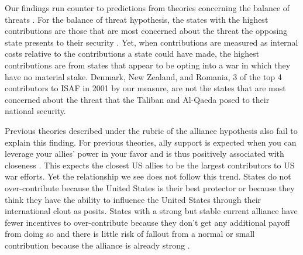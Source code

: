 \documentclass[12pt,letterpaper]{article}
\begin{document}
	Our findings run counter to predictions from theories concerning the balance of threats \citep{walt_originsalliance_1987}. For the balance of threat hypothesis, the states with the highest contributions are those that are most concerned about the threat the opposing state presents to their security \citep{haesebrouck_democraticparticipationair_2018}. Yet, when contributions are measured as internal costs relative to the contributions a state could have made, the highest contributions are from states that appear to be opting into a war in which they have no material stake. Denmark, New Zealand, and Romania, 3 of the top 4 contributors to ISAF in 2001 by our measure, are not the states that are most concerned about the threat that the Taliban and Al-Qaeda posed to their national security.

	Previous theories described under the rubric of the alliance hypothesis also fail to explain this finding. For previous theories, ally support is expected when you can leverage your allies' power in your favor and is thus positively associated with closeness \citep{davidson_neoclassicalrealistexplanation_2011, massie_democraticalliesfollowership_2016}. This expects the closest US allies to be the largest contributors to US war efforts. Yet the relationship we see does not follow this trend. States do not over-contribute because the United States is their best protector or because they think they have the ability to influence the United States through their international clout as \citet{ringsmose_natoburdensharingredux_2010} posits. States with a strong but stable current alliance have fewer incentives to over-contribute because they don't get any additional payoff from doing so and there is little risk of fallout from a normal or small contribution because the alliance is already strong \citep{davidson_headingexitsdemocratic_2014}.
	
\end{document}
